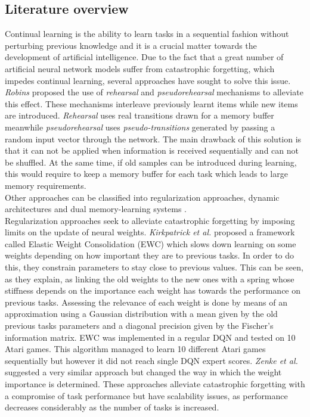 \documentclass{article}
\begin{document}
\subsection{Literature overview}
Continual learning is the ability to learn tasks in a sequential fashion without perturbing previous knowledge and it is a crucial matter towards the development of artificial intelligence. Due to the fact that a great number of artificial neural network models suffer from catastrophic forgetting, which impedes continual learning, several approaches have sought to solve this issue.\\
\newline
\textit{Robins} \citep{RobinsConsolidationBrain} proposed the use of \textit{rehearsal} and \textit{pseudorehearsal} mechanisms to alleviate this effect. These mechanisms interleave previously learnt items while new items are introduced. \textit{Rehearsal} uses real transitions drawn for a memory buffer meanwhile \textit{pseudorehearsal} uses \textit{pseudo-transitions} generated by passing a random input vector through the network. The main drawback of this solution is that it can not be applied when information is received sequentially and can not be shuffled. At the same time, if old samples can be introduced during learning, this would require to keep a memory buffer for each task which leads to large memory requirements.\\
Other approaches can be classified into regularization approaches, dynamic architectures and dual memory-learning systems \citep{Parisi2018ContinualReview}.\\
\newline
Regularization approaches seek to alleviate catastrophic forgetting by imposing limits on the update of neural weights. \textit{Kirkpatrick et al.} \citep{Kirkpatrick2017OvercomingNetworks.} proposed a framework called Elastic Weight Consolidation (EWC) which slows down learning on some weights depending on how important they are to previous tasks. In order to do this, they constrain parameters to stay close to previous values. This can be seen, as they explain, as linking the old weights to the new ones with a spring whose stiffness depends on the importance each weight has towards the performance on previous tasks. Assessing the relevance of each weight is done by means of an approximation using a Gaussian distribution with a mean given by the old previous tasks parameters and a diagonal precision given by the Fischer's information matrix. EWC was implemented in a regular DQN and tested on 10 Atari games. This algorithm managed to learn  10 different Atari games sequentially but however it did not reach single DQN expert scores. \textit{Zenke et al.} \citep{Zenke2017ContinualIntelligence} suggested a very similar approach but changed the way in which the weight importance is determined. These approaches alleviate catastrophic forgetting with a compromise of task performance but have scalability issues, as performance decreases considerably as the number of tasks is increased.\\
\end{document}
